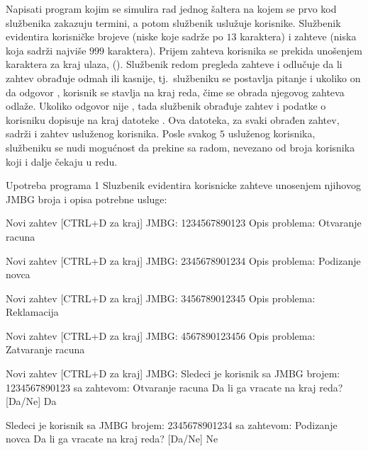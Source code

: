 \begin{Answer}[ref=605]
\end{Answer}
\begin{Exercise}[label=606]
Napisati program kojim se simulira rad jednog šaltera na kojem se prvo kod službenika zakazuju 
termini, a potom službenik uslužuje korisnike. 
Službenik evidentira korisničke  brojeve (niske koje sadrže po $13$ karaktera) i zahteve (niska koja sadrži najviše $999$ karaktera). 
Prijem zahteva korisnika se prekida unošenjem karaktera za kraj ulaza, ().
Službenik redom pregleda zahteve i odlučuje da li zahtev obrađuje odmah ili kasnije, tj.~službeniku se postavlja pitanje 
 i ukoliko on da odgovor , 
korisnik se stavlja na kraj reda, čime se obrada njegovog zahteva odlaže. Ukoliko odgovor nije , tada službenik obrađuje zahtev i podatke o korisniku dopisuje na kraj datoteke . Ova datoteka, za svaki obrađen zahtev, sadrži  i zahtev usluženog korisnika.
Posle svakog $5$ usluženog korisnika, službeniku se nudi mogućnost da prekine sa radom, nevezano od broja korisnika koji i dalje čekaju u redu. 
\noindent
\begin{maxitest}
\begin{test}{Upotreba programa 1}
Sluzbenik evidentira korisnicke zahteve unosenjem 
njihovog JMBG broja i opisa potrebne usluge:

Novi zahtev [CTRL+D za kraj]
        JMBG: 1234567890123
        Opis problema: Otvaranje racuna

Novi zahtev [CTRL+D za kraj]
        JMBG: 2345678901234
        Opis problema: Podizanje novca

Novi zahtev [CTRL+D za kraj]
        JMBG: 3456789012345
        Opis problema: Reklamacija

Novi zahtev [CTRL+D za kraj]
        JMBG: 4567890123456
        Opis problema: Zatvaranje racuna

Novi zahtev [CTRL+D za kraj]
        JMBG: 
Sledeci je korisnik sa JMBG brojem: 1234567890123
sa zahtevom: Otvaranje racuna
        Da li ga vracate na kraj reda? [Da/Ne] Da

Sledeci je korisnik sa JMBG brojem: 2345678901234
sa zahtevom: Podizanje novca
        Da li ga vracate na kraj reda? [Da/Ne] Ne


\end{test}
\end{maxitest}
\end{Exercise}
